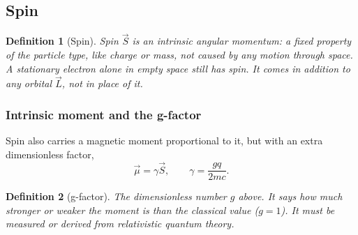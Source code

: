 \documentclass{article}
\newtheorem{definition}{Definition}
\begin{document}
\subsection{Spin}
\begin{definition}[Spin]
    Spin $\vec{S}$ is an \emph{intrinsic} angular momentum: a fixed property of the particle type, like charge or mass, not caused by any motion through space. A stationary electron alone in empty space still has spin. It comes in addition to any orbital $\vec{L}$, not in place of it.
\end{definition}

\subsubsection{Intrinsic moment and the g-factor}
Spin also carries a magnetic moment proportional to it, but with an extra dimensionless factor,
\begin{equation}
    \vec{\mu} = \gamma\vec{S}, \qquad \gamma = \frac{gq}{2mc}.
\end{equation}
\begin{definition}[g-factor]
    The dimensionless number $g$ above. It says how much stronger or weaker the moment is than the classical value ($g = 1$). It must be measured or derived from relativistic quantum theory.
\end{definition}
\end{document}
